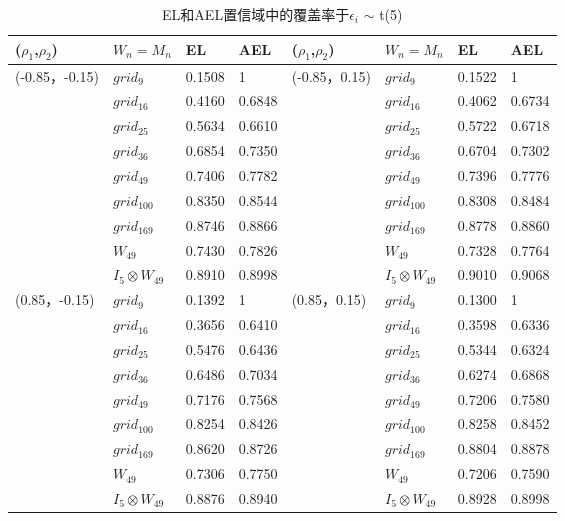 \documentclass[a4paper,c5size,onecolumn,twoside,cap,Chinese]{APSart}
\begin{document}
\begin{table}[htbp]
\setlength{\abovecaptionskip}{0.cm}
\centering
\caption{EL和AEL置信域中的覆盖率于$\epsilon_{i}$ $\sim$ t(5)\label{table:2}}
\begin{tabular*}{\hsize}{@{}@{\extracolsep{\fill}}llllllll@{}}
\hline
($\rho_{1}$,$\rho_{2}$)&$W_n=M_n$ & EL&AEL&($\rho_{1}$,$\rho_{2}$)&$W_n=M_n$ & EL&AEL\\
\hline
(-0.85，-0.15)& $grid_{9}$  	& 0.1508 & 1          &  (-0.85，0.15)	& $grid_{9}$ & 0.1522 & 1           \\
		& $grid_{16}$   	& 0.4160 & 0.6848 	&                 		& $grid_{16}$  & 0.4062 & 0.6734 \\
		& $grid_{25}$   	& 0.5634 & 0.6610 	&                 		& $grid_{25}$  & 0.5722 & 0.6718 \\
		& $grid_{36}$   	& 0.6854 & 0.7350 	&                	 	& $grid_{36}$  & 0.6704 & 0.7302\\
		& $grid_{49}$   	& 0.7406 & 0.7782 	&                 		& $grid_{49}$  & 0.7396 & 0.7776\\
                      & $grid_{100}$ 	& 0.8350 & 0.8544 	&                 		& $grid_{100}$ & 0.8308 & 0.8484\\
                      & $grid_{169}$ 	& 0.8746 & 0.8866	&                 		& $grid_{169}$ & 0.8778 & 0.8860 \\
                      & $W_{49}$ 	& 0.7430 & 0.7826 &                 		&  $W_{49}$ & 0.7328 & 0.7764    \\
                      & $I_{5}\otimes W_{49}$&0.8910& 0.8998&     &$I_{5}\otimes W_{49}$&   0.9010 &0.9068   \\
\hline
(0.85，-0.15) & $grid_{9}$   	& 0.1392 & 1           &  (0.85，0.15)	& $grid_{9}$  & 0.1300 & 1         \\
		& $grid_{16}$   	& 0.3656 & 0.6410 	&                 		& $grid_{16}$ & 0.3598 & 0.6336\\
		& $grid_{25}$   	& 0.5476 & 0.6436	&                 		& $grid_{25}$ & 0.5344 & 0.6324\\
		& $grid_{36}$   	& 0.6486 & 0.7034   &                 		& $grid_{36}$ & 0.6274 & 0.6868 \\
		& $grid_{49}$   	& 0.7176 & 0.7568   &                  		& $grid_{49}$ & 0.7206 & 0.7580\\
                      & $grid_{100}$ 	& 0.8254 & 0.8426   &                 		& $grid_{100}$ & 0.8258 & 0.8452\\
                      & $grid_{169}$ 	& 0.8620 & 0.8726   &                 		& $grid_{169}$ & 0.8804 & 0.8878 \\
                      & $W_{49}$ 	& 0.7306 & 0.7750&                 		&  $W_{49}$ &  0.7206 & 0.7590 \\
                      & $I_{5}\otimes W_{49}$& 0.8876 &0.8940 	&     &$I_{5}\otimes W_{49}$&0.8928& 0.8998   \\
\hline
\end{tabular*}
\end{table}
\end{document}
